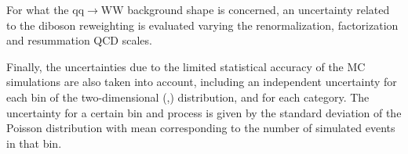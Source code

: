 
For what the $\mathrm{qq}\to\mathrm{WW}$ background shape is concerned, an uncertainty related to the diboson \pt reweighting is evaluated varying the renormalization, factorization and resummation QCD scales.

Finally, the uncertainties due to the limited statistical accuracy of the MC simulations are also taken into account, including an independent uncertainty for each bin of the two-dimensional  (\mll,\mt) distribution, and for each category. The uncertainty for a certain bin and process is given by the standard deviation of the Poisson distribution with mean corresponding to the number of simulated events in that bin.

 
